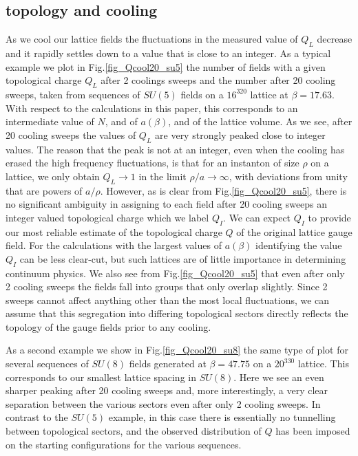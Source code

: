 \documentclass[12pt]{article}
\begin{document}
%
%
\subsection{topology and cooling}
\label{subsection_Qcooling} 

As we cool our lattice fields the fluctuations in the measured value of $Q_L$ decrease and
it rapidly settles down to a value that is close to an integer. As a typical example we plot in
Fig.\ref{fig_Qcool20_su5} the number of fields with a given topological charge $Q_L$ after
2 coolings sweeps and the number after 20 cooling sweeps, taken from sequences of $SU(5)$ fields
on a $16^320$ lattice at $\beta=17.63$. With respect to the calculations in this paper, this 
corresponds to an intermediate value of $N$, and of $a(\beta)$, and of the lattice volume. As we
see, after 20 cooling sweeps the values of $Q_L$ are very strongly peaked close to 
integer values. The reason that the peak is not at an integer, even when the cooling has
erased the high frequency fluctuations, is that for an instanton of size $\rho$ on a lattice,  
we only obtain $Q_L \to 1$ in the limit $\rho/a \to \infty$, with deviations from unity
that are powers of $a/\rho$. However, as is clear from Fig.\ref{fig_Qcool20_su5}, there is 
no significant ambiguity in assigning to each field after 20 cooling sweeps an integer valued 
topological charge which we label $Q_I$. We can expect $Q_I$ to provide our most reliable
estimate of the topological charge $Q$ of the original lattice gauge field. For the calculations
with the largest values of $a(\beta)$ identifying the value $Q_I$ can be
less  clear-cut, but such lattices are of little importance in determining continuum physics.
We also see from Fig.\ref{fig_Qcool20_su5} that even after only 2 cooling sweeps the fields
fall into groups that only overlap slightly. Since 2 sweeps cannot affect anything other 
than the most local fluctuations, we can assume that this segregation into differing topological 
sectors directly reflects the topology of the gauge fields prior to any cooling. 

As a second example we show in Fig.\ref{fig_Qcool20_su8} the same type of plot for several sequences 
of $SU(8)$ fields generated at $\beta=47.75$ on a $20^330$ lattice. This corresponds to our
smallest lattice spacing in $SU(8)$. Here we see an even sharper peaking after 20 cooling sweeps
and, more interestingly, a very clear separation between the various sectors even after only 2 cooling 
sweeps. In contrast to the $SU(5)$ example, in this case there is essentially no tunnelling between
topological sectors, and the observed distribution of $Q$ has been imposed on the starting
configurations for the various sequences.  
\end{document}
